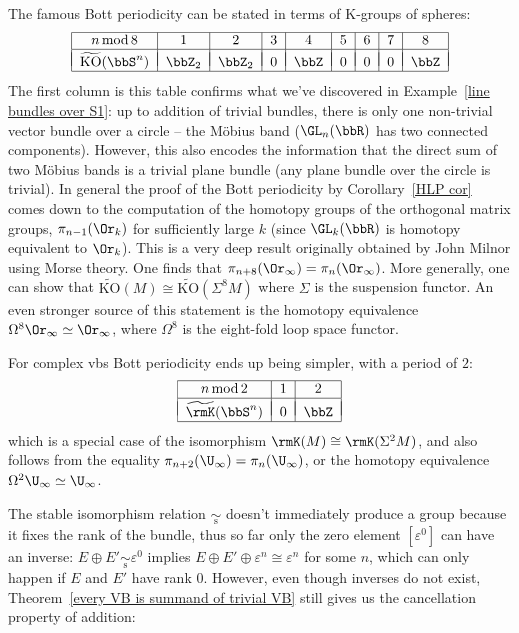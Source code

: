 \begin{example}
The famous Bott periodicity can be stated in terms of K-groups of spheres:
\[\begin{tabular}{|c|c|c|c|c|c|c|c|c|}
\hline 
$n\,\mathrm{mod}\,8$ & 1 & 2 & 3 & 4 & 5 & 6 & 7 & 8\tabularnewline
\hline &&&&&&&&\\[-1em]
$\widetilde{\mathrm{KO}}(\bbS^{n})$ & $\bbZ_{2}$ & $\bbZ_{2}$ & $0$ & $\bbZ$ & $0$ & $0$ & $0$ & $\bbZ$\tabularnewline
\hline 
\end{tabular}\]
The first column is this table confirms what we've discovered in Example~\ref{line bundles over S1}: up to addition of trivial bundles, there is only one non-trivial vector bundle over a circle -- the M\"obius band ($\GL_n(\bbR)$ has two connected components). However, this also encodes the information that the direct sum of two M\"obius bands is a trivial plane bundle (any plane bundle over the circle is trivial). In general the proof of the Bott periodicity by Corollary~\ref{HLP cor} comes down to the computation of the homotopy groups of the orthogonal matrix groups, $\pi_{n-1}(\Or_k)$ for sufficiently large $k$ (since $\GL_k(\bbR)$ is homotopy equivalent to $\Or_k$). This is a very deep result originally obtained by John Milnor using Morse theory. One finds that $\pi_{n+8}(\Or_\infty)=\pi_n(\Or_\infty)$. More generally, one can show that $\widetilde{\mathrm{KO}}(M)\cong \widetilde{\mathrm{KO}}(\Sigma^8 M)$ where $\Sigma$ is the suspension functor. An even stronger source of this statement is the homotopy equivalence $\Omega^8\Or_\infty\simeq \Or_\infty$, where $\Omega^8$ is the eight-fold loop space functor.

For complex \glspl{vb} Bott periodicity ends up being simpler, with a period of $2$:
\[\begin{tabular}{|c|c|c|}
\hline 
$n\,\mathrm{mod}\,2$ & 1 & 2 \tabularnewline
\hline &&\\[-1em]
$\widetilde{\rmK}(\bbS^{n})$ & $0$ & $\bbZ$ \tabularnewline
\hline 
\end{tabular}\]
which is a special case of the isomorphism $\rmK(M)\cong \rmK(\Sigma^2 M)$, and also follows from the equality $\pi_{n+2}(\U_\infty)=\pi_n(\U_\infty)$, or the homotopy equivalence $\Omega^2 \U_\infty\simeq \U_\infty$.
\end{example}


The stable isomorphism relation $\underset{\mathrm{s}}{\sim}$ doesn't immediately produce a group because it fixes the rank of the bundle, thus so far only the zero element $[\varepsilon^0]$ can have an inverse: $E\oplus E'\underset{\mathrm{s}}{\sim}\varepsilon^0$ implies $E\oplus E'\oplus \varepsilon^n\cong \varepsilon^n$ for some $n$, which can only happen if $E$ and $E'$ have rank $0$. However, even though inverses do not exist, Theorem~\ref{every VB is summand of trivial VB} still gives us the cancellation property of addition:

